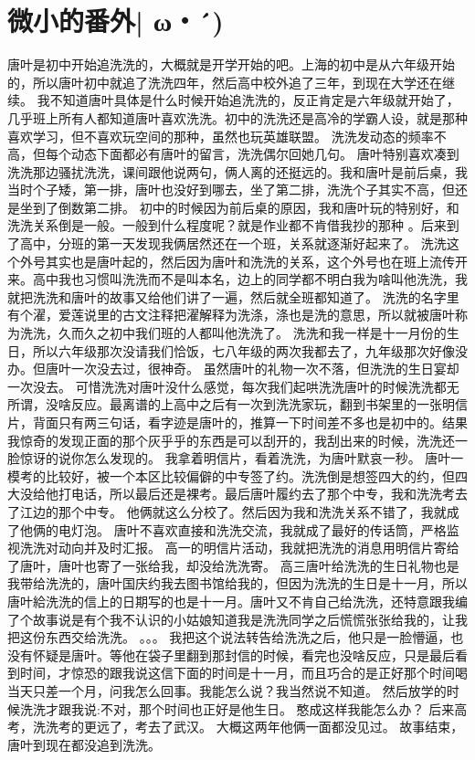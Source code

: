 \chapter{微小的番外| ω・´)}
唐叶是初中开始追洗洗的，大概就是开学开始的吧。上海的初中是从六年级开始的，所以唐叶初中就追了洗洗四年，然后高中校外追了三年，到现在大学还在继续。
我不知道唐叶具体是什么时候开始追洗洗的，反正肯定是六年级就开始了，几乎班上所有人都知道唐叶喜欢洗洗。初中的洗洗还是高冷的学霸人设，就是那种喜欢学习，但不喜欢玩空间的那种，虽然也玩英雄联盟。
洗洗发动态的频率不高，但每个动态下面都必有唐叶的留言，洗洗偶尔回她几句。
唐叶特别喜欢凑到洗洗那边骚扰洗洗，课间跟他说两句，俩人离的还挺远的。我和唐叶是前后桌，我当时个子矮，第一排，唐叶也没好到哪去，坐了第二排，洗洗个子其实不高，但还是坐到了倒数第二排。
初中的时候因为前后桌的原因，我和唐叶玩的特别好，和洗洗关系倒是一般。一般到什么程度呢？就是作业都不肯借我抄的那种 。后来到了高中，分班的第一天发现我俩居然还在一个班，关系就逐渐好起来了。
洗洗这个外号其实也是唐叶起的，然后因为唐叶和洗洗的关系，这个外号也在班上流传开来。高中我也习惯叫洗洗而不是叫本名，边上的同学都不明白我为啥叫他洗洗，我就把洗洗和唐叶的故事又给他们讲了一遍，然后就全班都知道了。
洗洗的名字里有个濯，爱莲说里的古文注释把濯解释为洗涤，涤也是洗的意思，所以就被唐叶称为洗洗，久而久之初中我们班的人都叫他洗洗了。
洗洗和我一样是十一月份的生日，所以六年级那次没请我们恰饭，七八年级的两次我都去了，九年级那次好像没办。但唐叶一次没去过，很神奇。
虽然唐叶的礼物一次不落，但洗洗的生日宴却一次没去。
可惜洗洗对唐叶没什么感觉，每次我们起哄洗洗唐叶的时候洗洗都无所谓，没啥反应。最离谱的上高中之后有一次到洗洗家玩，翻到书架里的一张明信片，背面只有两三句话，看字迹是唐叶的，推算一下时间差不多也是初中的。结果我惊奇的发现正面的那个灰乎乎的东西是可以刮开的，我刮出来的时候，洗洗还一脸惊讶的说你怎么发现的。
我拿着明信片，看着洗洗，为唐叶默哀一秒。
唐叶一模考的比较好，被一个本区比较偏僻的中专签了约。洗洗倒是想签四大的约，但四大没给他打电话，所以最后还是裸考。最后唐叶履约去了那个中专，我和洗洗考去了江边的那个中专。
他俩就这么分校了。然后因为我和洗洗关系不错了，我就成了他俩的电灯泡。
唐叶不喜欢直接和洗洗交流，我就成了最好的传话筒，严格监视洗洗对动向并及时汇报。
高一的明信片活动，我就把洗洗的消息用明信片寄给了唐叶，唐叶也寄了一张给我，却没给洗洗寄。
高三唐叶给洗洗的生日礼物也是我带给洗洗的，唐叶国庆约我去图书馆给我的，但因为洗洗的生日是十一月，所以唐叶給洗洗的信上的日期写的也是十一月。唐叶又不肯自己给洗洗，还特意跟我编了个故事说是有个我不认识的小姑娘知道我是洗洗同学之后慌慌张张给我的，让我把这份东西交给洗洗。
。。。
我把这个说法转告给洗洗之后，他只是一脸懵逼，也没有怀疑是唐叶。等他在袋子里翻到那封信的时候，看完也没啥反应，只是最后看到时间，才惊恐的跟我说这信下面的时间是十一月，而且巧合的是正好那个时间喝当天只差一个月，问我怎么回事。我能怎么说？我当然说不知道。
然后放学的时候洗洗才跟我说:不对，那个时间也正好是他生日。
憨成这样我能怎么办？
后来高考，洗洗考的更远了，考去了武汉。
大概这两年他俩一面都没见过。
故事结束，唐叶到现在都没追到洗洗。

